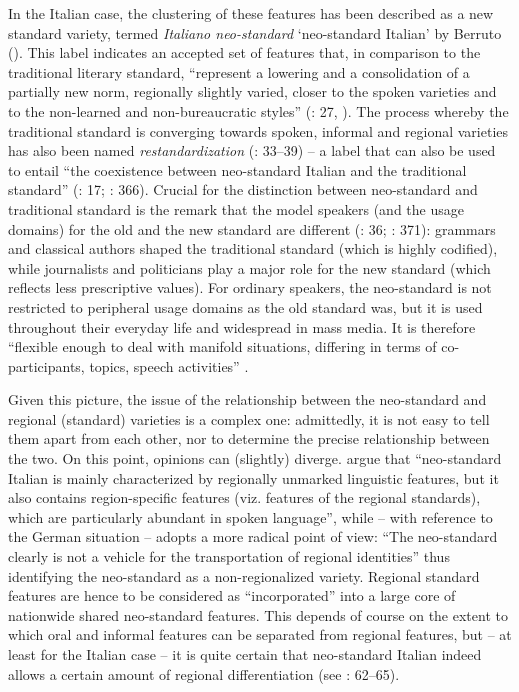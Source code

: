 In the Italian case, the clustering of these features has been described as a new standard variety, termed \textit{Italiano neo-standard} ‘neo-standard Italian’ by Berruto (\citeyear{Berruto2012}). This label indicates an accepted set of features that, in comparison to the traditional literary standard, “represent a lowering and a consolidation of a partially new norm, regionally slightly varied, closer to the spoken varieties and to the non-learned and non-bureaucratic styles” (\citealt{Berruto2012}: 27, \citeyear[33]{Berruto2017}). The process whereby the traditional standard is converging towards spoken, informal and regional varieties has also been named \textit{restandardization} (\citealt{Berruto2017}: 33–39) – a label that can also be used to entail “the coexistence between neo-standard Italian and the traditional standard” (\citealt{CerrutiEtAl2017}: 17; \citealt{Auer2017}: 366). Crucial for the distinction between neo-standard and traditional standard is the remark that the model speakers (and the usage domains) for the old and the new standard are different (\citealt{Berruto2017}: 36; \citealt{Auer2017}: 371): grammars and classical authors shaped the traditional standard (which is highly codified), while journalists and politicians play a major role for the new standard (which reflects less prescriptive values). For ordinary speakers, the neo-standard is not restricted to peripheral usage domains as the old standard was, but it is used throughout their everyday life and widespread in mass media. It is therefore “flexible enough to deal with manifold situations, differing in terms of co-participants, topics, speech activities” \citep[371]{Auer2017}.

Given this picture, the issue of the relationship between the neo-standard and regional (standard) varieties is a complex one: admittedly, it is not easy to tell them apart from each other, nor to determine the precise relationship between the two. On this point, opinions can (slightly) diverge. \citet[8]{CerrutiEtAl2017} argue that “neo-standard Italian is mainly characterized by regionally unmarked linguistic features, but it also contains region-specific features (viz. features of the regional standards), which are particularly abundant in spoken language”, while \citet[368]{Auer2017} – with reference to the German situation –  adopts a more radical point of view: “The neo-standard clearly is not a vehicle for the transportation of regional identities” thus identifying the neo-standard as a non-regionalized variety. Regional standard features are hence to be considered as “incorporated” into a large core of nationwide shared neo-standard features. This depends of course on the extent to which oral and informal features can be separated from regional features, but – at least for the Italian case – it is quite certain that neo-standard Italian indeed allows a certain amount of regional differentiation (see \citealt{Berruto2012}: 62–65).

